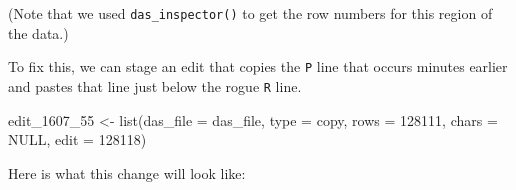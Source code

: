 \documentclass[
]{book}
\newenvironment{Shaded}{\begin{snugshade}}{\end{snugshade}}
\newcommand{\AttributeTok}[1]{\textcolor[rgb]{0.77,0.63,0.00}{#1}}
\newcommand{\ConstantTok}[1]{\textcolor[rgb]{0.00,0.00,0.00}{#1}}
\newcommand{\DecValTok}[1]{\textcolor[rgb]{0.00,0.00,0.81}{#1}}
\newcommand{\FunctionTok}[1]{\textcolor[rgb]{0.00,0.00,0.00}{#1}}
\newcommand{\NormalTok}[1]{#1}
\newcommand{\OtherTok}[1]{\textcolor[rgb]{0.56,0.35,0.01}{#1}}
\newcommand{\StringTok}[1]{\textcolor[rgb]{0.31,0.60,0.02}{#1}}
\begin{document}
(Note that we used \texttt{das\_inspector()} to get the row numbers for this region of the data.)

To fix this, we can stage an edit that copies the \texttt{P} line that occurs minutes earlier and pastes that line just below the rogue \texttt{R} line.

\begin{Shaded}
\begin{Highlighting}[]
\NormalTok{edit\_1607\_55 }\OtherTok{\textless{}{-}} 
  \FunctionTok{list}\NormalTok{(}\AttributeTok{das\_file =}\NormalTok{ das\_file,}
       \AttributeTok{type =} \StringTok{\textquotesingle{}copy\textquotesingle{}}\NormalTok{,}
       \AttributeTok{rows =} \DecValTok{128111}\NormalTok{,}
       \AttributeTok{chars =} \ConstantTok{NULL}\NormalTok{,}
       \AttributeTok{edit =} \DecValTok{128118}\NormalTok{)}
\end{Highlighting}
\end{Shaded}

Here is what this change will look like:
\end{document}
